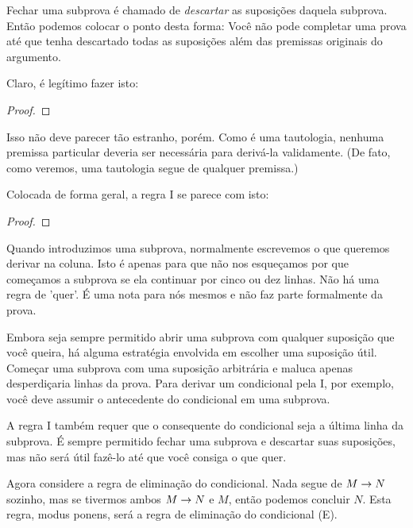 Fechar uma subprova é chamado de \emph{descartar} as suposições daquela subprova. Então podemos colocar o ponto desta forma: Você não pode completar uma prova até que tenha descartado todas as suposições além das premissas originais do argumento.

Claro, é legítimo fazer isto:

\begin{proof}
	\open
		 
	\close
	 
\end{proof}

Isso não deve parecer tão estranho, porém. Como \eif{} é uma tautologia, nenhuma premissa particular deveria ser necessária para derivá-la validamente. (De fato, como veremos, uma tautologia segue de qualquer premissa.)

Colocada de forma geral, a regra {\eif}I se parece com isto:

\begin{proof}
	\open
		 
	\close
\end{proof}

Quando introduzimos uma subprova, normalmente escrevemos o que queremos derivar na coluna. Isto é apenas para que não nos esqueçamos por que começamos a subprova se ela continuar por cinco ou dez linhas. Não há uma regra de 'quer'. É uma nota para nós mesmos e não faz parte formalmente da prova.

Embora seja sempre permitido abrir uma subprova com qualquer suposição que você queira, há alguma estratégia envolvida em escolher uma suposição útil. Começar uma subprova com uma suposição arbitrária e maluca apenas desperdiçaria linhas da prova. Para derivar um condicional pela {\eif}I, por exemplo, você deve assumir o antecedente do condicional em uma subprova.

A regra {\eif}I também requer que o consequente do condicional seja a última linha da subprova. É sempre permitido fechar uma subprova e descartar suas suposições, mas não será útil fazê-lo até que você consiga o que quer.

Agora considere a regra de eliminação do condicional. Nada segue de $M\rightarrow N$ sozinho, mas se tivermos ambos $M \rightarrow N$ e $M$, então podemos concluir $N$. Esta regra, modus ponens, será a regra de eliminação do condicional ({\eif}E).

